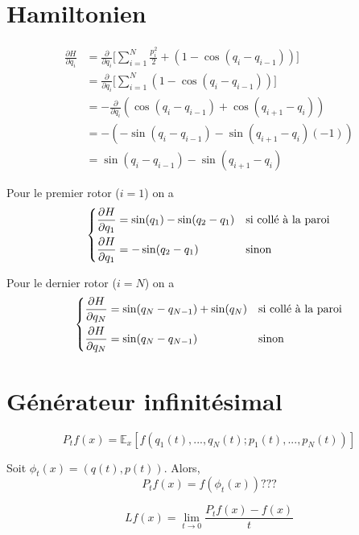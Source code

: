 \section{Hamiltonien}


\begin{align}
    \frac{\partial H}{\partial q_i}
    &= \frac{\partial}{\partial q_i} \Big[ \sum_{i=1}^N \frac{p_i^2}{2}
    + (1 - \cos(q_i - q_{i-1})) \Big] \\
%
    &= \frac{\partial}{\partial q_i}
    \Big[ \sum_{i=1}^N (1 - \cos(q_i - q_{i-1})) \Big] \\
%
    &= - \frac{\partial}{\partial q_i} (\cos(q_i - q_{i-1}) + \cos(q_{i+1} - q_i)) \\
%
    &= -  (-\sin(q_i - q_{i-1}) - \sin(q_{i+1} - q_i)(-1)) \\
%
    &= \sin(q_i - q_{i-1}) - \sin(q_{i+1} - q_i)
\end{align}

Pour le premier rotor ($i = 1$) on a
\[\begin{dcases}
    \frac{\partial H}{\partial q_1} = \sin(q_1) - \sin(q_2 - q_1)
    & \text{si collé à la paroi} \\
    \frac{\partial H}{\partial q_1} = -\sin(q_2 - q_1)
    & \text{sinon}
\end{dcases}\]

Pour le dernier rotor ($i = N$) on a
\[\begin{dcases}
    \frac{\partial H}{\partial q_N} = \sin(q_N - q_{N-1}) + \sin(q_N)
    & \text{si collé à la paroi} \\
    \frac{\partial H}{\partial q_N} = \sin(q_N - q_{N-1})
    & \text{sinon}
\end{dcases}\]



\section{Générateur infinitésimal}

$$P_t f(x) = \mathbb{E}_x [f(q_1(t), ..., q_N(t); p_1(t), ..., p_N(t))]$$



Soit $\phi_t(x) = (q(t), p(t))$. Alors,
$$P_t f(x) = f(\phi_t(x)) ???$$

$$Lf(x) = \lim_{t \rightarrow 0} \frac{P_t f(x) - f(x)}{t}$$

